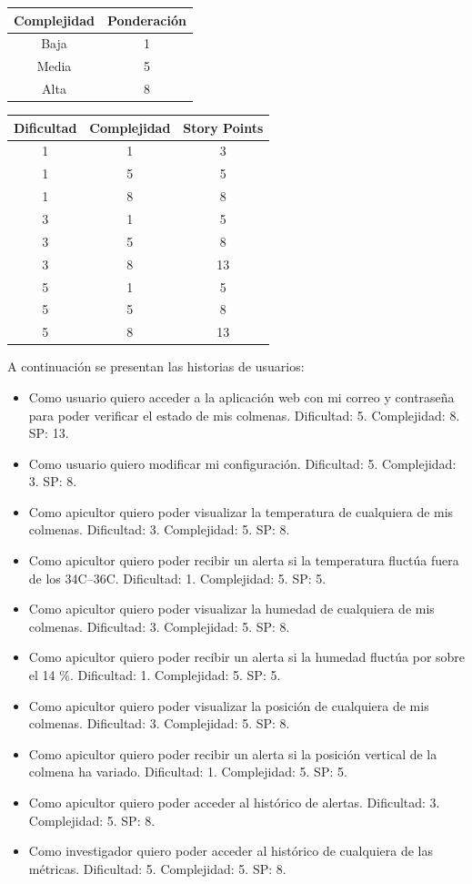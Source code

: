 \documentclass[
11pt, %
codirector, %
]{charter}
\begin{document}
\begin{tabular}{|c|c|}
\hline
\rowcolor[HTML]{C0C0C0} 
Complejidad & Ponderación \\ \hline
Baja      & 1 \\ \hline
Media      & 5 \\ \hline
Alta      & 8 \\ \hline
\end{tabular}

\begin{tabular}{|c|c|c|}
\hline
\rowcolor[HTML]{C0C0C0} 
Dificultad & Complejidad & Story Points \\ \hline
1 & 1 & 3 \\ \hline
1 & 5 & 5 \\ \hline
1 & 8 & 8 \\ \hline
3 & 1 & 5 \\ \hline
3 & 5 & 8 \\ \hline
3 & 8 & 13 \\ \hline
5 & 1 & 5 \\ \hline
5 & 5 & 8 \\ \hline
5 & 8 & 13 \\ \hline
\end{tabular}

A continuación se presentan las historias de usuarios:
\begin{itemize}
	\item Como usuario quiero acceder a la aplicación web con mi correo y contraseña para poder verificar el estado de mis colmenas. Dificultad: 5. Complejidad: 8. SP: 13.
	\item Como usuario quiero modificar mi configuración. Dificultad: 5. Complejidad: 3. SP: 8.
	\item Como apicultor quiero poder visualizar la temperatura de cualquiera de mis colmenas. Dificultad: 3. Complejidad: 5. SP: 8.
	\item Como apicultor quiero poder recibir un alerta si la temperatura fluctúa fuera de los 34\textdegree{}C--36\textdegree{}C. Dificultad: 1. Complejidad: 5. SP: 5.
	\item Como apicultor quiero poder visualizar la humedad de cualquiera de mis colmenas. Dificultad: 3. Complejidad: 5. SP: 8.
	\item Como apicultor quiero poder recibir un alerta si la humedad fluctúa por sobre el 14 \%. Dificultad: 1. Complejidad: 5. SP: 5.
	\item Como apicultor quiero poder visualizar la posición de cualquiera de mis colmenas. Dificultad: 3. Complejidad: 5. SP: 8.
	\item Como apicultor quiero poder recibir un alerta si la posición vertical de la colmena ha variado. Dificultad: 1. Complejidad: 5. SP: 5.
	\item Como apicultor quiero poder acceder al histórico de alertas. Dificultad: 3. Complejidad: 5. SP: 8.
	\item Como investigador quiero poder acceder al histórico de cualquiera de las métricas. Dificultad: 5. Complejidad: 5. SP: 8.
\end{itemize}
\end{document}
